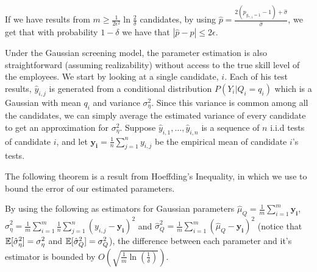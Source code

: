 \begin{theorem}
If we have results from $m\geq \frac{1}{2\epsilon^2} \ln \frac{2}{\delta}$ candidates, 
by using $\hat{p}=\frac{2(p_{y_{*,1}=1}-1)+\hat{\sigma}}{\hat{{\sigma}}}$,
we get that with probability $1-\delta$ we have that $|\hat{p}-p|\leq 2\epsilon$.
\end{theorem}
Under the Gaussian screening model,
the parameter estimation is also straightforward 
(assuming realizability) without access to the true skill level of the employees. 
We start by looking at a single candidate, $i$. 
Each of his test results, $\hat{y}_{i,j}$ is generated 
from a conditional distribution $P(Y_{i}|Q_i=q_i)$ 
which is a Gaussian with mean $q_i$ and variance $\sigma_\eta^2$. 
Since this variance is common among all the candidates, 
we can simply average the estimated variance of every candidate 
to get an approximation for $\sigma_\eta^2$.
Suppose $\hat{y}_{i,1},\dots,\hat{y}_{i,n}$ is a sequence of $n$ i.i.d tests of candidate $i$, 
and let $\boldsymbol{y_i}=\frac{1}{n}\sum_{j=1}^n y_{i,j}$ 
be the empirical mean of candidate $i$'s tests.

The following theorem is a result from Hoeffding’s Inequality, 
in which we use to bound the error of our estimated parameters.
\begin{theorem}
By using the following as estimators for Gaussian parameters $\hat{\mu}_Q=\frac{1}{m}\sum_{i=1}^m\boldsymbol{y_i}$,
$\hat{\sigma}_{\eta}^2=\frac{1}{m}\sum_{i=1}^m\frac{1}{n}\sum_{j=1}^{n} (y_{i,j}-\boldsymbol{y_i})^2$ and $\hat{\sigma}_{Q}^2=\frac{1}{m}\sum_{i=1}^m (\hat{\mu}_Q-\boldsymbol{y_i})^2$
(notice that $\mathbb{E}[\hat{\sigma}_{\eta}^2]={\sigma}_{\eta}^2$ and  $\mathbb{E}[\hat{\sigma}_{Q}^2]={\sigma}_{Q}^2$), the difference between each parameter and it's estimator is bounded by $O(\sqrt{\frac{1}{m}\ln(\frac{1}{\delta})})$.
\end{theorem}